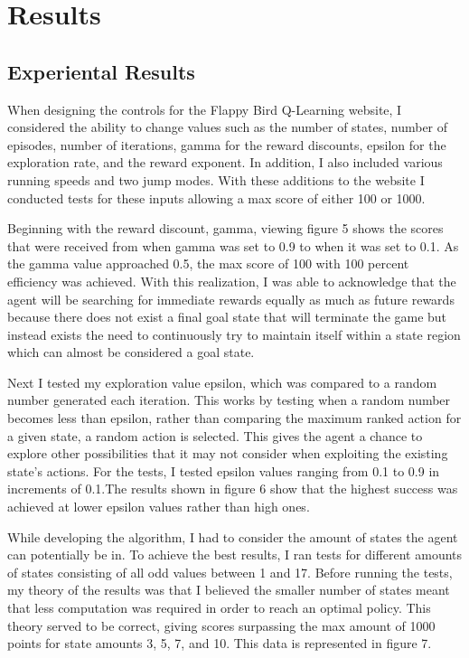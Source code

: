 \documentclass{article}
\begin{document}
\section{Results}

\subsection{Experiental Results}
When designing the controls for the Flappy Bird Q-Learning website, I considered the ability to change values such as the number of states, number of episodes, number of iterations, gamma for the reward discounts, epsilon for the exploration rate, and the reward exponent. In addition, I also included various running speeds and two jump modes. With these additions to the website I conducted tests for these inputs allowing a max score of either 100 or 1000. 

Beginning with the reward discount, gamma, viewing figure 5 shows the scores that were received from when gamma was set to 0.9 to when it was set to 0.1. As the gamma value approached 0.5, the max score of 100 with 100 percent efficiency was achieved. With this realization, I was able to acknowledge that the agent will be searching for immediate rewards equally as much as future rewards because there does not exist a final goal state that will terminate the game but instead exists the need to continuously try to maintain itself within a state region which can almost be considered a goal state. 

Next I tested my exploration value epsilon, which was compared to a random number generated each iteration. This works by testing when a random number becomes less than epsilon, rather than comparing the maximum ranked action for a given state, a random action is selected. This gives the agent a chance to explore other possibilities that it may not consider when exploiting the existing state's actions. For the tests, I tested epsilon values ranging from 0.1 to 0.9 in increments of 0.1.The results shown in figure 6 show that the highest success was achieved at lower epsilon values rather than high ones.

While developing the algorithm, I had to consider the amount of states the agent can potentially be in. To achieve the best results, I ran tests for different amounts of states consisting of all odd values between 1 and 17. Before running the tests, my theory of the results was that I believed the smaller number of states meant that less computation was required in order to reach an optimal policy. This theory served to be correct, giving scores surpassing the max amount of 1000 points for state amounts 3, 5, 7, and 10. This data is represented in figure 7. 
\end{document}
